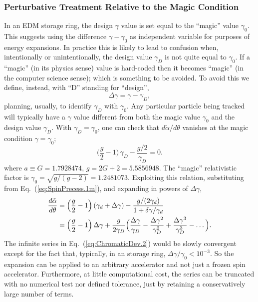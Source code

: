 \documentclass[]{article}
\begin{document}
\subsubsection{Perturbative Treatment Relative to the Magic Condition}
In an EDM storage ring, the design $\gamma$ value
is set equal to the ``magic'' value $\gamma_0$. This
suggests using the difference $\gamma-\gamma_0$ as independent
variable for purposes of energy expansions. In practice this
is likely to lead to confusion when, intentionally or 
unintentionally, the design value $\gamma_D$ is not quite
equal to $\gamma_0$. If a ``magic'' (in its physics sense) 
value is hard-coded then it becomes ``magic'' (in the computer
science sense); which is something to be avoided. To avoid
this we define, instead, with ``D'' standing for ``design'',
%
\begin{equation}
\Delta\gamma
 = 
\gamma - \gamma_D,
\label{eq:SpinPrecess.1m}
\end{equation}
%
planning, usually, to identify $\gamma_D$ with $\gamma_0$. 
Any particular particle being tracked will typically
have a $\gamma$ value different from both the magic value $\gamma_0$
and the design value $\gamma_D$.
With $\gamma_D=\gamma_0$, 
one can check that $d\tilde\alpha/d\theta$ vanishes at the magic 
condition $\gamma=\gamma_0$; 
%
\begin{equation}
\Big(\frac{g}{2}-1\Big)\,\gamma_D - \frac{g/2}{\gamma_D}
 =
0.
\label{eq:ChromaticDev.1}
\end{equation}
%
where $a\equiv G = 1.7928474$, $g=2G+2 = 5.5856948$. The ``magic'' relativistic
factor is $\gamma_0=\sqrt{g/(g-2)}=1.2481073$.
Exploiting this relation, substituting from Eq.~(\ref{eq:SpinPrecess.1m}),
and expanding in powers of $\Delta\gamma$,
%
\begin{align}
\frac{d\tilde\alpha}{d\theta}
 &=
\Big(\frac{g}{2}-1\Big)\,(\gamma_d + \Delta\gamma)
 -
\frac{g/(2\gamma_d)}{1+\delta\gamma/\gamma_d}          \notag \\
 &=
\Big(\frac{g}{2}-1\Big)\,\Delta\gamma
 +
\frac{g}{2\gamma_D}
\Big(
\frac{\Delta\gamma}{\gamma_D}
 - \frac{\Delta\gamma^2}{\gamma^2_D}
 + \frac{\Delta\gamma^3}{\gamma^3_D}
 - \dots
\Big).
\label{eq:ChromaticDev.2}
\end{align}
%
The infinite series in Eq.~(\ref{eq:ChromaticDev.2})
would be slowly convergent except for the fact that,
typically, in an storage ring, $\Delta\gamma/\gamma_0<10^{-3}$.
So the expansion can be applied to an arbitrary accelerator
and not just a frozen spin accelerator. Furthermore, at little
computational cost, the series can be truncated with no numerical
test nor defined tolerance, just by retaining a conservatively large 
number of terms.
\end{document}
